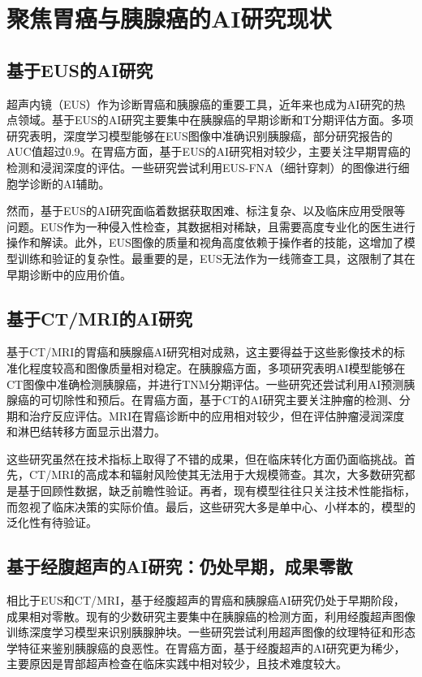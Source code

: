 \section{聚焦胃癌与胰腺癌的AI研究现状}

\subsection{基于EUS的AI研究}

超声内镜（EUS）作为诊断胃癌和胰腺癌的重要工具，近年来也成为AI研究的热点领域。基于EUS的AI研究主要集中在胰腺癌的早期诊断和T分期评估方面。多项研究表明，深度学习模型能够在EUS图像中准确识别胰腺癌，部分研究报告的AUC值超过0.9。在胃癌方面，基于EUS的AI研究相对较少，主要关注早期胃癌的检测和浸润深度的评估。一些研究尝试利用EUS-FNA（细针穿刺）的图像进行细胞学诊断的AI辅助。

然而，基于EUS的AI研究面临着数据获取困难、标注复杂、以及临床应用受限等问题。EUS作为一种侵入性检查，其数据相对稀缺，且需要高度专业化的医生进行操作和解读。此外，EUS图像的质量和视角高度依赖于操作者的技能，这增加了模型训练和验证的复杂性。最重要的是，EUS无法作为一线筛查工具，这限制了其在早期诊断中的应用价值。

\subsection{基于CT/MRI的AI研究}

基于CT/MRI的胃癌和胰腺癌AI研究相对成熟，这主要得益于这些影像技术的标准化程度较高和图像质量相对稳定。在胰腺癌方面，多项研究表明AI模型能够在CT图像中准确检测胰腺癌，并进行TNM分期评估。一些研究还尝试利用AI预测胰腺癌的可切除性和预后。在胃癌方面，基于CT的AI研究主要关注肿瘤的检测、分期和治疗反应评估。MRI在胃癌诊断中的应用相对较少，但在评估肿瘤浸润深度和淋巴结转移方面显示出潜力。

这些研究虽然在技术指标上取得了不错的成果，但在临床转化方面仍面临挑战。首先，CT/MRI的高成本和辐射风险使其无法用于大规模筛查。其次，大多数研究都是基于回顾性数据，缺乏前瞻性验证。再者，现有模型往往只关注技术性能指标，而忽视了临床决策的实际价值。最后，这些研究大多是单中心、小样本的，模型的泛化性有待验证。

\subsection{基于经腹超声的AI研究：仍处早期，成果零散}

相比于EUS和CT/MRI，基于经腹超声的胃癌和胰腺癌AI研究仍处于早期阶段，成果相对零散。现有的少数研究主要集中在胰腺癌的检测方面，利用经腹超声图像训练深度学习模型来识别胰腺肿块。一些研究尝试利用超声图像的纹理特征和形态学特征来鉴别胰腺癌的良恶性。在胃癌方面，基于经腹超声的AI研究更为稀少，主要原因是胃部超声检查在临床实践中相对较少，且技术难度较大。

